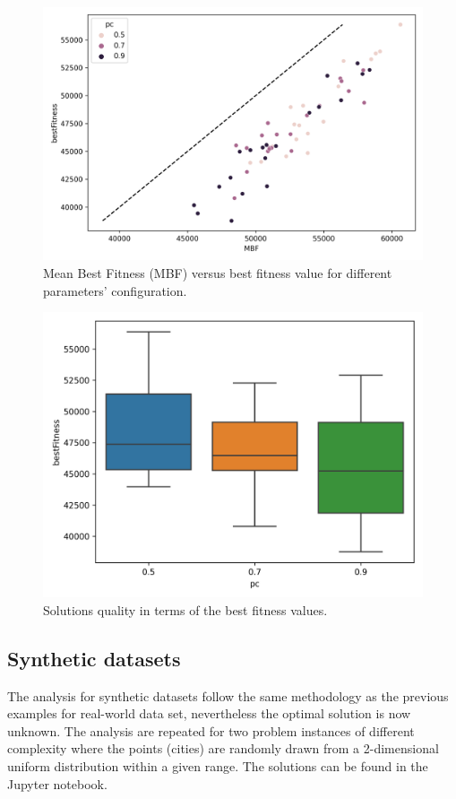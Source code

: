 \documentclass[10pt,a4paper]{article}
\begin{document}
\newpage
\begin{figure}[h!]
    \centering
    \includegraphics[scale=0.75]{../figures/48citiesMBFvsbF.png}
    \caption{Mean Best Fitness (MBF) versus best fitness value for different parameters' configuration.}
    \label{fig:mbfvsbf48}
\end{figure}

\begin{figure}[h!]
    \centering
    \includegraphics[scale=0.75]{../figures/48citiesquality.png}
    \caption{Solutions quality in terms of the best fitness values.}
    \label{fig:quality48}
\end{figure}

\subsection*{Synthetic datasets}
The analysis for synthetic datasets follow the same methodology as the previous examples for real-world data set, nevertheless the optimal solution is now unknown. The analysis are repeated for two problem instances of different complexity where the points (cities) are randomly drawn from a 2-dimensional uniform distribution within a given range. The solutions can be found in the Jupyter notebook.
\end{document}
